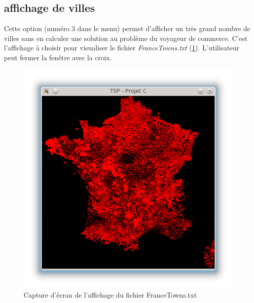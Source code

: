 \documentclass[a4paper,11pt]{article}
\begin{document}
\subsection{affichage de villes}
Cette option (numéro 3 dans le menu) permet d'afficher un très grand nombre de villes sans en calculer une solution au problème du voyageur de commerce. C'est l'affichage à choisir pour visualiser le fichier \textit{FranceTowns.txt} (\ref{fig1}). L'utilisateur peut fermer la fenêtre avec la croix.
\begin{center}
\begin{figure}[htbp]
\begin{center}
\includegraphics[scale=0.3]{france.png}
\caption{Capture d'écran de l'affichage du fichier FranceTowns.txt}
\label{fig1}
\end{center}
\end{figure}
\end{center}
\end{document}
